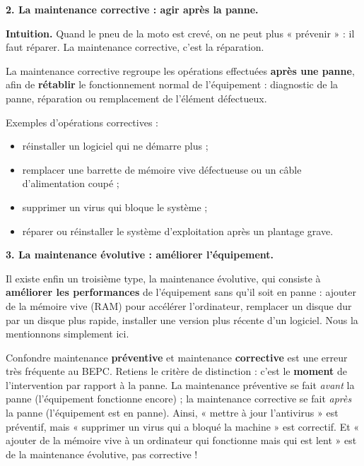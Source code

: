 \documentclass[11pt]{article}
\newcommand{\cle}[1]{{\popxbold\color{popdark}#1}}
\begin{document}
\textbf{2. La maintenance corrective : agir après la panne.}

\textbf{Intuition.} Quand le pneu de la moto est crevé, on ne peut plus « prévenir » : il faut réparer. La maintenance corrective, c'est la réparation.

\begin{definition}
La \cle{maintenance corrective} regroupe les opérations effectuées \textbf{après une panne}, afin de \textbf{rétablir} le fonctionnement normal de l'équipement : diagnostic de la panne, réparation ou remplacement de l'élément défectueux.
\end{definition}

Exemples d'opérations correctives :
\begin{itemize}
\item réinstaller un logiciel qui ne démarre plus ;
\item remplacer une barrette de mémoire vive défectueuse ou un câble d'alimentation coupé ;
\item supprimer un virus qui bloque le système ;
\item réparer ou réinstaller le système d'exploitation après un plantage grave.
\end{itemize}

\textbf{3. La maintenance évolutive : améliorer l'équipement.}

Il existe enfin un troisième type, la \cle{maintenance évolutive}, qui consiste à \textbf{améliorer les performances} de l'équipement sans qu'il soit en panne : ajouter de la mémoire vive (RAM) pour accélérer l'ordinateur, remplacer un disque dur par un disque plus rapide, installer une version plus récente d'un logiciel. Nous la mentionnons simplement ici.

\begin{attention}
Confondre maintenance \textbf{préventive} et maintenance \textbf{corrective} est une erreur très fréquente au BEPC. Retiens le critère de distinction : c'est le \textbf{moment} de l'intervention par rapport à la panne. La maintenance préventive se fait \emph{avant} la panne (l'équipement fonctionne encore) ; la maintenance corrective se fait \emph{après} la panne (l'équipement est en panne). Ainsi, « mettre à jour l'antivirus » est préventif, mais « supprimer un virus qui a bloqué la machine » est correctif. Et « ajouter de la mémoire vive à un ordinateur qui fonctionne mais qui est lent » est de la maintenance évolutive, pas corrective !
\end{attention}
\end{document}
